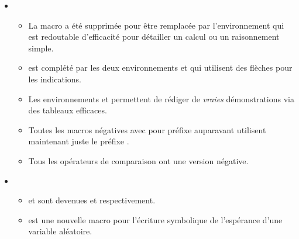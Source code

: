 \begin{itemize}[itemsep=.5em]
    \separation
    \item {}
    \begin{itemize}[itemsep=.5em]
        \item La macro  a été supprimée pour être remplacée par l'environnement  qui est redoutable d'efficacité pour détailler un calcul ou un raisonnement simple.
        
        \item {} est complété par les deux environnements  et  qui utilisent des flèches pour les indications.

        \item Les environnements  et  permettent de rédiger de \emph{\og vraies \fg} démonstrations via des tableaux efficaces.

        \item Toutes les macros négatives avec pour préfixe  auparavant utilisent maintenant juste le préfixe .

        \item Tous les opérateurs de comparaison ont une version négative.
    \end{itemize}




    \separation
    \item {}
    \begin{itemize}[itemsep=.5em]
        \item {} et  sont devenues  et  respectivement.
        
        \item {} est une nouvelle macro pour l'écriture symbolique de l'espérance d'une  variable aléatoire.
    \end{itemize}
\end{itemize}

